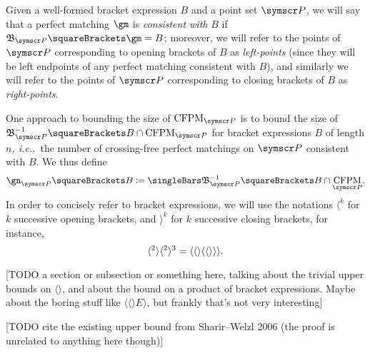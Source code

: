 \documentclass[10pt, a4paper, twoside]{basestyle}
\newcommand{\idest}{\emph{, i.e.,\ }}
\DeclareMathOperator{\CFPM}{CFPM}
\newcommand{\pointset}{\symscr}
\begin{document}
Given a well-formed bracket expression $B$ and a point set $\pointset P$, we will say that a perfect matching
$\gm$ is \emph{consistent with} $B$ if ${\mathfrak B}_{\pointset P}\of\gm = B$; moreover, we will refer to the points of
$\pointset P$ corresponding to opening brackets of $B$ as \emph{left-points} (since they will be left endpoints
of any perfect matching consistent with $B$), and similarly we will refer to the points of $\pointset P$
corresponding to closing brackets of $B$ as \emph{right-points}.

One approach to bounding the size of $\CFPM_{\pointset P}$ is to bound the size of
${\mathfrak B}_{\pointset P}^{-1}\of{B}\Intersection \CFPM_{\pointset P}$ for bracket expressions $B$ of length $n$\idest the
number of crossing-free perfect matchings on $\pointset P$ consistent with $B$. We thus define
\[\gn_{\pointset P}\of B \DefineAs
\Cardinality{{\mathfrak B}_{\pointset P}^{-1}\of{B}\Intersection \CFPM_{\pointset P}}\text.\]
In order to concisely refer to bracket expressions, we will use the notations
$\langle^k$ for $k$ successive opening brackets, and $\rangle^k$ for $k$ successive
closing brackets, for instance,\[
\langle^2\rangle\langle^2\rangle^3 = \langle\langle\rangle\langle\langle\rangle\rangle\rangle
\text.\]

[TODO a section or subsection or something here, talking about the trivial upper bounds on $\langle\rangle$,
and about the bound on a product of bracket expressions. Maybe about the boring stuff like
$\langle\langle\rangle E \rangle$, but frankly that's not very interesting]

[TODO cite the existing upper bound from Sharir--Welzl 2006 (the proof is unrelated to anything here
though)]
\label{boundOnLeftRightPerfectMatchings}
\end{document}
